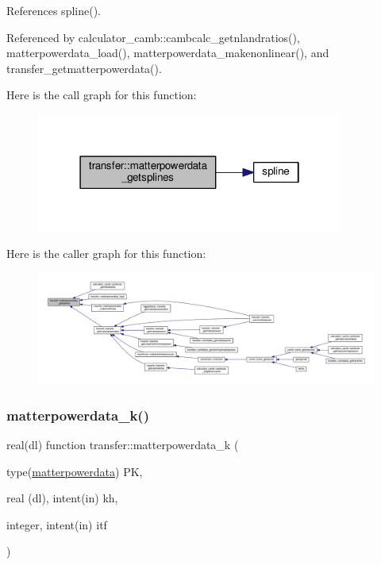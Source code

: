 References spline().



Referenced by calculator\+\_\+camb\+::cambcalc\+\_\+getnlandratios(), matterpowerdata\+\_\+load(), matterpowerdata\+\_\+makenonlinear(), and transfer\+\_\+getmatterpowerdata().

Here is the call graph for this function\+:
\nopagebreak
\begin{figure}[H]
\begin{center}
\leavevmode
\includegraphics[width=286pt]{namespacetransfer_ad195947cd911f4aef6edba0319f4ac2f_cgraph}
\end{center}
\end{figure}
Here is the caller graph for this function\+:
\nopagebreak
\begin{figure}[H]
\begin{center}
\leavevmode
\includegraphics[width=350pt]{namespacetransfer_ad195947cd911f4aef6edba0319f4ac2f_icgraph}
\end{center}
\end{figure}
\mbox{\label{namespacetransfer_a7d7e2b6a55941b8e40b01b2cfed0af02}} 
\subsubsection{\texorpdfstring{matterpowerdata\+\_\+k()}{matterpowerdata\_k()}}
{\footnotesize\ttfamily real(dl) function transfer\+::matterpowerdata\+\_\+k (\begin{DoxyParamCaption}\item[{type(\mbox{\hyperlink{structtransfer_1_1matterpowerdata}{matterpowerdata}})}]{PK,  }\item[{real (dl), intent(in)}]{kh,  }\item[{integer, intent(in)}]{itf }\end{DoxyParamCaption})}



